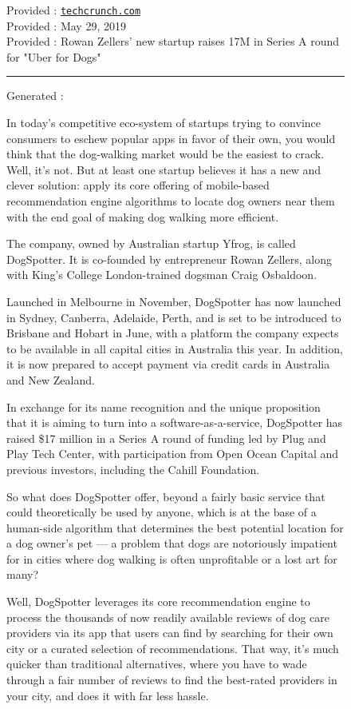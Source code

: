 \documentclass{article}
\begin{document}
\begin{figure}[t]
Provided \domainfield: {\tt\small \href{https://techcrunch.com}{techcrunch.com}} \\
Provided \datefield: May 29, 2019 \\
Provided \headlinefield: Rowan Zellers' new startup raises 17M in Series A round for "Uber for Dogs"

\hrule
Generated \bodyfield:
{\small
In today’s competitive eco-system of startups trying to convince consumers to eschew popular apps in favor of their own, you would think that the dog-walking market would be the easiest to crack. Well, it’s not. But at least one startup believes it has a new and clever solution: apply its core offering of mobile-based recommendation engine algorithms to locate dog owners near them with the end goal of making dog walking more efficient.

The company, owned by Australian startup Yfrog, is called DogSpotter. It is co-founded by entrepreneur Rowan Zellers, along with King’s College London-trained dogsman Craig Osbaldoon.

Launched in Melbourne in November, DogSpotter has now launched in Sydney, Canberra, Adelaide, Perth, and is set to be introduced to Brisbane and Hobart in June, with a platform the company expects to be available in all capital cities in Australia this year. In addition, it is now prepared to accept payment via credit cards in Australia and New Zealand.

In exchange for its name recognition and the unique proposition that it is aiming to turn into a software-as-a-service, DogSpotter has raised \$17 million in a Series A round of funding led by Plug and Play Tech Center, with participation from Open Ocean Capital and previous investors, including the Cahill Foundation.

So what does DogSpotter offer, beyond a fairly basic service that could theoretically be used by anyone, which is at the base of a human-side algorithm that determines the best potential location for a dog owner’s pet — a problem that dogs are notoriously impatient for in cities where dog walking is often unprofitable or a lost art for many?

Well, DogSpotter leverages its core recommendation engine to process the thousands of now readily available reviews of dog care providers via its app that users can find by searching for their own city or a curated selection of recommendations. That way, it’s much quicker than traditional alternatives, where you have to wade through a fair number of reviews to find the best-rated providers in your city, and does it with far less hassle.

}
\end{figure}
\end{document}
